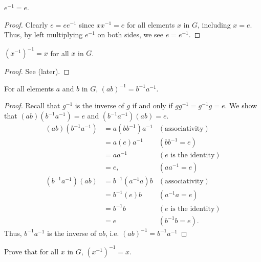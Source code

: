 \begin{proposition}\label{prop-inverse-of-identity-is-identity}
    $e^{-1} = e$.
\end{proposition}
\begin{proof}
    Clearly $e = ee^{-1}$ since $xx^{-1} = e$ for all elements $x$ in $G$, including $x = e$. Thus, by left multiplying $e^{-1}$ on both sides, we see $e = e^{-1}$.
\end{proof}

\begin{proposition}
    $\left(x^{-1}\right)^{-1} = x$ for all $x$ in $G$.
\end{proposition}
\begin{proof}
    See  (later).
\end{proof}

\begin{proposition}
    For all elements $a$ and $b$ in $G$, $(ab)^{-1} = b^{-1}a^{-1}$.
\end{proposition}
\begin{proof}
    Recall that $g^{-1}$ is the inverse of $g$ if and only if $gg^{-1} = g^{-1}g = e$. We show that $(ab)(b^{-1}a^{-1}) = e$ and $(b^{-1}a^{-1})(ab) = e$.
    \begin{align*}
        (ab)(b^{-1}a^{-1}) &= a(bb^{-1})a^{-1} & (\text{associativity})\\
        &= a(e)a^{-1} & (bb^{-1} = e)\\
        &= aa^{-1} & (e \text{ is the identity})\\
        &= e, & (aa^{-1} = e)\\
        (b^{-1}a^{-1})(ab) &= b^{-1}(a^{-1}a)b & (\text{associativity})\\
        &= b^{-1}(e)b & (a^{-1}a = e)\\
        &= b^{-1}b & (e \text{ is the identity})\\
        &= e & ( b^{-1}b = e).
    \end{align*}
    Thus, $b^{-1}a^{-1}$ is the inverse of $ab$, i.e. $(ab)^{-1} = b^{-1}a^{-1}$
\end{proof}

\begin{exercise}\label{exercise-inverse-of-inverse-is-element}
Prove that for all $x$ in $G$, $\left(x^{-1}\right)^{-1} = x$.
\end{exercise}

